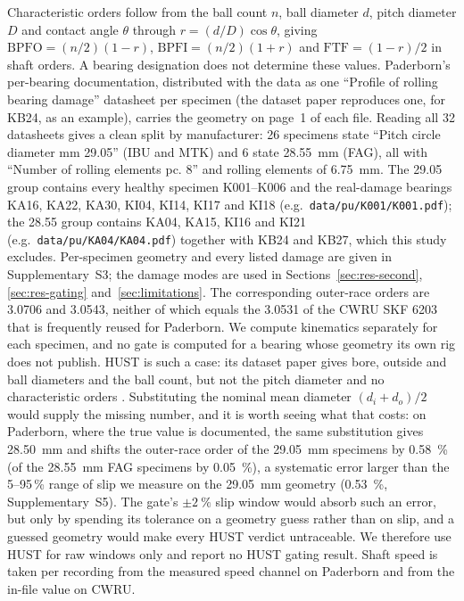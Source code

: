 Characteristic orders follow from the ball count $n$, ball diameter $d$, pitch diameter $D$ and contact angle $\theta$
through $r=(d/D)\cos\theta$, giving $\mathrm{BPFO}=(n/2)(1-r)$, $\mathrm{BPFI}=(n/2)(1+r)$ and
$\mathrm{FTF}=(1-r)/2$ in shaft orders. A bearing designation does not determine these values. Paderborn's
per-bearing documentation, distributed with the data as one ``Profile of rolling bearing damage'' datasheet per specimen
(the dataset paper reproduces one, for KB24, as an example), carries the geometry on page~1 of each file. Reading all 32 datasheets gives a clean
split by manufacturer: 26 specimens state ``Pitch circle diameter mm 29.05'' (IBU and MTK) and 6 state
\SI{28.55}{\milli\metre} (FAG), all with ``Number of rolling elements pc. 8'' and rolling elements of
\SI{6.75}{\milli\metre}. The 29.05 group contains every healthy specimen K001--K006 and the real-damage bearings KA16,
KA22, KA30, KI04, KI14, KI17 and KI18 (e.g.\ \texttt{data/pu/K001/K001.pdf}); the 28.55 group contains KA04, KA15, KI16
and KI21 (e.g.\ \texttt{data/pu/KA04/KA04.pdf}) together with KB24 and KB27, which this study excludes. Per-specimen
geometry and every listed damage are given in Supplementary~S3; the damage modes are used in Sections~\ref{sec:res-second},
\ref{sec:res-gating} and~\ref{sec:limitations}. The corresponding
outer-race orders are 3.0706 and 3.0543, neither of which equals the 3.0531 of the CWRU SKF 6203 that is frequently reused
for Paderborn. We compute kinematics separately for each specimen, and no gate is computed for a bearing whose geometry its own rig does
not publish. HUST is such a case: its dataset paper gives bore, outside and ball diameters and the ball count, but not the
pitch diameter and no characteristic orders \cite{thuan2023hust}. Substituting the nominal mean diameter $(d_i+d_o)/2$
would supply the missing number, and it is worth seeing what that costs: on Paderborn, where the true value is documented,
the same substitution gives \SI{28.50}{\milli\metre} and shifts the outer-race order of the \SI{29.05}{\milli\metre}
specimens by \SI{0.58}{\percent} (of the \SI{28.55}{\milli\metre} FAG specimens by \SI{0.05}{\percent}), a systematic error
larger than the 5--95\,\% range of slip we measure on the \SI{29.05}{\milli\metre} geometry (\SI{0.53}{\percent},
Supplementary~S5). The gate's $\pm\SI{2}{\percent}$ slip window would absorb such an error, but only by
spending its tolerance on a geometry guess rather than on slip, and a guessed geometry would make every HUST verdict
untraceable. We therefore use HUST for raw windows only and report no HUST gating result. Shaft speed is taken per
recording from the measured speed channel on Paderborn and from the in-file value on CWRU.

